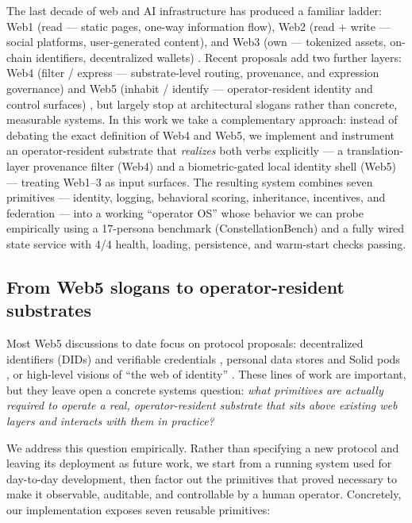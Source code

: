\documentclass{article}
\begin{document}
The last decade of web and AI infrastructure has produced a familiar
ladder: Web1 (read --- static pages, one-way information flow), Web2
(read + write --- social platforms, user-generated content), and Web3
(own --- tokenized assets, on-chain identifiers, decentralized wallets)
\citep{bernerslee1989, oconnor2023web4}. Recent proposals add two
further layers: Web4 (filter / express --- substrate-level routing,
provenance, and expression governance) and Web5 (inhabit / identify ---
operator-resident identity and control surfaces)
\citep{tbd_web5, solid_pods, ssi_survey}, but largely stop at
architectural slogans rather than concrete, measurable systems. In this
work we take a complementary approach: instead of debating the exact
definition of Web4 and Web5, we implement and instrument an
operator-resident substrate that \emph{realizes} both verbs explicitly
--- a translation-layer provenance filter (Web4) and a biometric-gated
local identity shell (Web5) --- treating Web1--3 as input surfaces. The
resulting system combines seven primitives --- identity, logging,
behavioral scoring, inheritance, incentives, and federation --- into a
working ``operator OS'' whose behavior we can probe empirically using a
17-persona benchmark (ConstellationBench) and a fully wired state
service with 4/4 health, loading, persistence, and warm-start checks
passing.

\subsection{From Web5 slogans to operator-resident
substrates}\label{from-web5-slogans-to-operator-resident-substrates}

Most Web5 discussions to date focus on protocol proposals: decentralized
identifiers (DIDs) and verifiable credentials \citep{w3c_did_core},
personal data stores and Solid pods \citep{solid_pods}, or high-level
visions of ``the web of identity'' \citep{tbd_web5}. These lines of work
are important, but they leave open a concrete systems question:
\emph{what primitives are actually required to operate a real,
operator-resident substrate that sits above existing web layers and
interacts with them in practice?}

We address this question empirically. Rather than specifying a new
protocol and leaving its deployment as future work, we start from a
running system used for day-to-day development, then factor out the
primitives that proved necessary to make it observable, auditable, and
controllable by a human operator. Concretely, our implementation exposes
seven reusable primitives:
\end{document}
